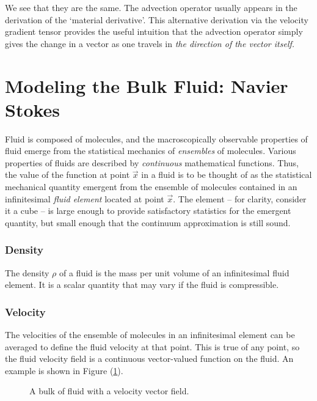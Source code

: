 \documentclass[12pt, a4paper, twoside, openright]{book}
\begin{document}
We see that they are the same.  The advection operator usually appears in the derivation of the `material derivative'.  This alternative derivation via the velocity gradient tensor provides the useful intuition that the advection operator simply gives the change in a vector as one travels in \emph{the direction of the vector itself.} 



\clearpage
\section{Modeling the Bulk Fluid: Navier Stokes}

Fluid is composed of molecules, and the macroscopically observable properties of fluid emerge from the statistical mechanics of \emph{ensembles} of molecules.  Various properties of fluids are described by \emph{continuous} mathematical functions.  Thus, the value of the function at point $\vec{x}$ in a fluid is to be thought of as the statistical mechanical quantity emergent from the ensemble of molecules contained in an infinitesimal \emph{fluid element} located at point $\vec{x}$.
The element -- for clarity, consider it a cube -- is large enough to provide satisfactory statistics for the emergent quantity, but small enough that the continuum approximation is still sound.

\subsubsection{Density}

The density $\rho$ of a fluid is the mass per unit volume of an infinitesimal fluid element.  
It is a scalar quantity that may vary if the fluid is compressible.

\subsubsection{Velocity}

The velocities of the ensemble of molecules in an infinitesimal element can be averaged to define the fluid velocity at that point.  This is true of any point, so the fluid velocity field is a continuous vector-valued function on the fluid. An example is shown in Figure (\ref{bulkfluid}).

\begin{figure}[ht]
\centering
{}
\caption{A bulk of fluid with a velocity vector field.}\label{bulkfluid}
\end{figure}
\end{document}
